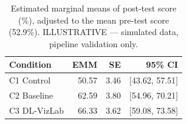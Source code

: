 \begin{table}[htbp]
\centering
\small
\caption{Estimated marginal means of post-test score (\%), adjusted to the mean pre-test score (52.9\%). ILLUSTRATIVE — simulated data, pipeline validation only.}
\label{tab:T05}
\begin{tabular}{lrrr}
\toprule
Condition & EMM & SE & 95\% CI \\
\midrule
C1 Control & 50.57 & 3.46 & [43.62, 57.51] \\
C2 Baseline & 62.59 & 3.80 & [54.96, 70.21] \\
C3 DL-VizLab & 66.33 & 3.62 & [59.08, 73.58] \\
\bottomrule
\end{tabular}
\end{table}
